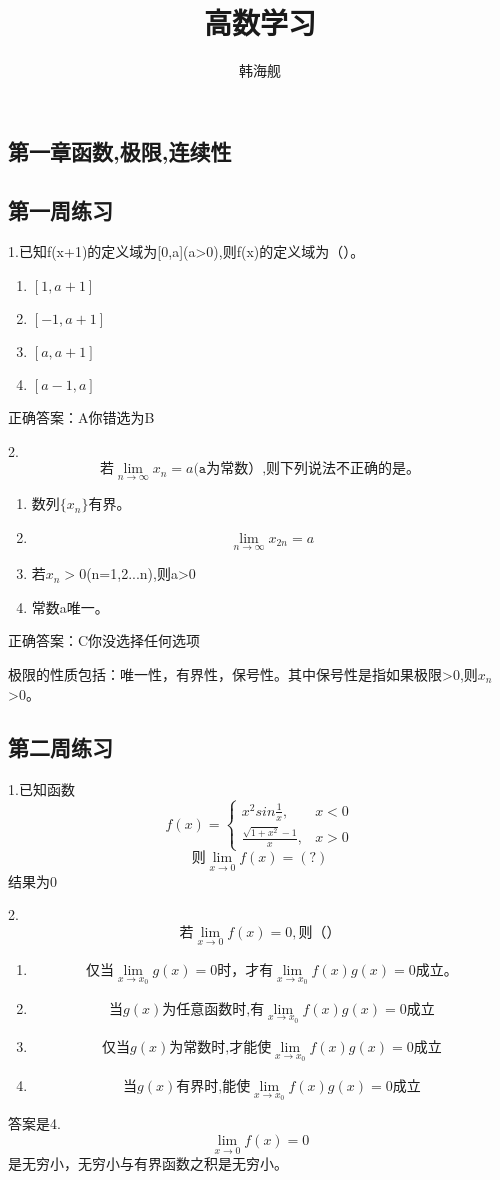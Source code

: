 \documentclass[fleqn]{article}
\begin{document}
\title{高数学习}
\author{韩海舰}
\maketitle
\setlength{\mathindent}{10pt}
\begin{flushleft}
\section{第一章\quad 函数,极限,连续性}
\subsection{第一周练习}
1.已知f(x+1)的定义域为[0,a](a>0),则f(x)的定义域为（）。
\begin{enumerate}
\item $[1,a+1]$
\item $[-1,a+1]$
\item $[a,a+1]$
\item $[a-1,a]$
\end{enumerate}

正确答案：A你错选为B

2. \[\texttt{若}\lim_{n\to \infty}x_n=a\texttt{(a为常数）,则下列说法不正确的是。}\]
\begin{enumerate}
\item 数列$\{x_n\}$有界。
\item \[\lim_{n\to \infty}x_{2n}=a\]
\item 若$x_n>0$(n=1,2...n),则a>0
\item 常数a唯一。
\end{enumerate}
正确答案：C你没选择任何选项

极限的性质包括：唯一性，有界性，保号性。其中保号性是指如果极限>0,则$x_n$>0。
\subsection{第二周练习}
\par
1.已知函数\[
f(x)=\left\{\begin{array}{ll}
x^2sin\frac{1}{x} ,& x<0 \\
\frac{\sqrt{1+x^2}-1}{x}, & x>0
\end{array}
\right. 
\]
\[\texttt{则}\lim_{x\to 0}f(x)=(?)
\]
结果为0
\par
2.\[
\texttt{若}\lim_{x\to 0}f(x)=0,\texttt{则（）}\]
\begin{enumerate}
\item \[\texttt{仅当}\lim_{x\to x_0}g(x)=0\texttt{时，才有}\lim_{x\to x_0}f(x)g(x)=0\texttt{成立。}\]
\item \[\texttt{当}g(x)\texttt{为任意函数时,有}\lim_{x\to x_0}f(x)g(x)=0\texttt{成立}\]
\item \[\texttt{仅当}g(x)\texttt{为常数时,才能使}\lim_{x\to x_0}f(x)g(x)=0\texttt{成立}\]
\item \[\texttt{当}g(x)\texttt{有界时,能使}\lim_{x\to x_0}f(x)g(x)=0\texttt{成立}\]
\end{enumerate}
答案是4.\[\lim_{x\to 0}f(x)=0\]是无穷小，无穷小与有界函数之积是无穷小。


\end{flushleft}
\end{document}
